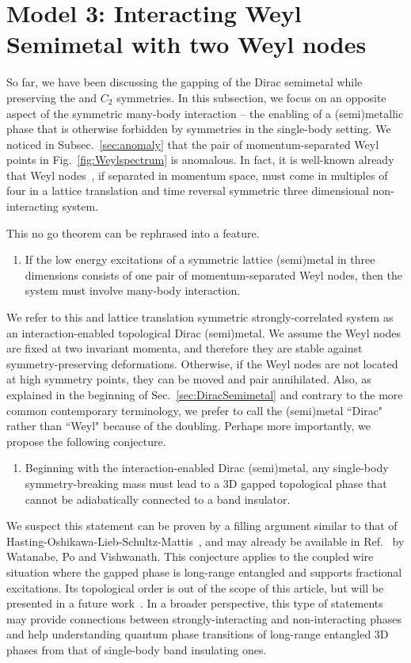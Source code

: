 \chapter{Model 3: Interacting Weyl Semimetal with two Weyl nodes}\label{chap:Model3}

So far, we have been discussing the gapping of the Dirac semimetal while preserving the \AFTR and $C_2$ symmetries. In this subsection, we focus on an opposite aspect of the symmetric many-body interaction -- the enabling of a (semi)metallic phase that is otherwise forbidden by symmetries in the single-body setting. We noticed in Subsec.~\ref{sec:anomaly} that the pair of momentum-separated Weyl points in Fig.~\ref{fig:Weylspectrum} is anomalous. In fact, it is well-known already that Weyl nodes~\cite{Murakami2007,WanVishwanathSavrasovPRB11,YangLuRan11,burkovBalenstPRL11,Ashvin_Weyl_review}, if separated in momentum space, must come in multiples of four in a lattice translation and time reversal symmetric three dimensional non-interacting system. 

This no go theorem can be rephrased into a feature. \begin{enumerate}\item If the low energy excitations of a \TR symmetric lattice (semi)metal in three dimensions consists of one pair of momentum-separated Weyl nodes, then the system must involve many-body interaction.\end{enumerate} We refer to this \TR and lattice translation symmetric strongly-correlated system as an interaction-enabled topological Dirac (semi)metal. We assume the Weyl nodes are fixed at two \TR invariant momenta, and therefore they are stable against symmetry-preserving deformations. Otherwise, if the Weyl nodes are not located at high symmetry points, they can be moved and pair annihilated. Also, as explained in the beginning of Sec.~\ref{sec:DiracSemimetal} and contrary to the more common contemporary terminology, we prefer to call the (semi)metal ``Dirac" rather than ``Weyl" because of the doubling. Perhaps more importantly, we propose the following conjecture. \begin{enumerate}\addtocounter{enumi}{1}\item Beginning with the interaction-enabled Dirac (semi)metal, {any} single-body symmetry-breaking mass must lead to a 3D gapped topological phase that cannot be adiabatically connected to a band insulator.\end{enumerate} We suspect this statement can be proven by a filling argument similar to that of Hasting-Oshikawa-Lieb-Schultz-Mattis~\cite{LiebSchultzMattis61,Oshikawa00,Hastings04}, and may already be available in Ref.~\cite{WatanabePoVishwanath17} by Watanabe, Po and Vishwanath. This conjecture applies to the coupled wire situation where the gapped phase is long-range entangled and supports fractional excitations. Its topological order is out of the scope of this article, but will be presented in a future work~\cite{SirotaRazaTeoappearsoon}. In a broader perspective, this type of statements may provide connections between strongly-interacting and non-interacting phases and help understanding quantum phase transitions of long-range entangled 3D phases from that of single-body band insulating ones.

